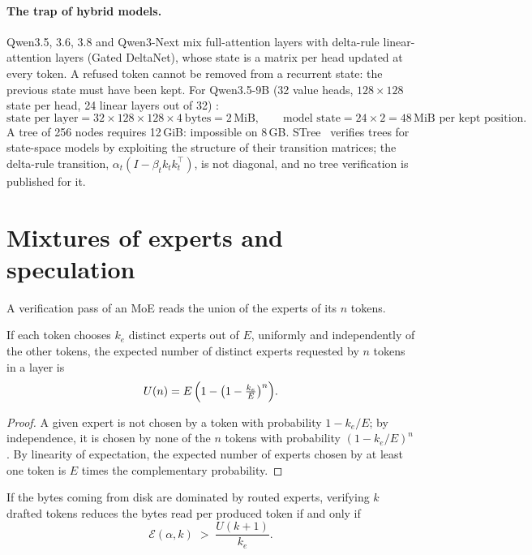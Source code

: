 \paragraph{The trap of hybrid models.} Qwen3.5, 3.6, 3.8 and Qwen3-Next mix full-attention layers with delta-rule linear-attention layers (Gated DeltaNet), whose state is a matrix per head updated at every token. A refused token cannot be removed from a recurrent state: the previous state must have been kept. For Qwen3.5-9B (32 value heads, $128 \times 128$ state per head, 24 linear layers out of 32) \calc:
\[
\text{state per layer} = 32 \times 128 \times 128 \times 4\ \text{bytes} = 2\,\text{MiB}, \qquad \text{model state} = 24 \times 2 = 48\,\text{MiB per kept position}.
\]
A tree of 256 nodes requires 12\,GiB: impossible on 8\,GB. STree~\cite{stree2025} verifies trees for state-space models by exploiting the structure of their transition matrices; the delta-rule transition, $\alpha_t (I - \beta_t k_t k_t^\top)$, is not diagonal, and no tree verification is published for it.

\section{Mixtures of experts and speculation}\label{sec:moe-spec}

A verification pass of an MoE reads the union of the experts of its $n$ tokens.

\begin{lemme}\label{lem:union}
If each token chooses $k_e$ distinct experts out of $E$, uniformly and independently of the other tokens, the expected number of distinct experts requested by $n$ tokens in a layer is
\begin{equation}\label{eq:union}
U(n) = E\,\Bigl(1 - \bigl(1 - \tfrac{k_e}{E}\bigr)^{n}\Bigr).
\end{equation}
\end{lemme}

\begin{proof}
A given expert is not chosen by a token with probability $1 - k_e/E$; by independence, it is chosen by none of the $n$ tokens with probability $(1 - k_e/E)^n$. By linearity of expectation, the expected number of experts chosen by at least one token is $E$ times the complementary probability.
\end{proof}

\begin{proposition}\label{prop:spec-moe}
If the bytes coming from disk are dominated by routed experts, verifying $k$ drafted tokens reduces the bytes read per produced token if and only if
\begin{equation}\label{eq:spec-moe}
\mathcal E(\alpha, k) \;>\; \frac{U(k+1)}{k_e}.
\end{equation}
\end{proposition}


